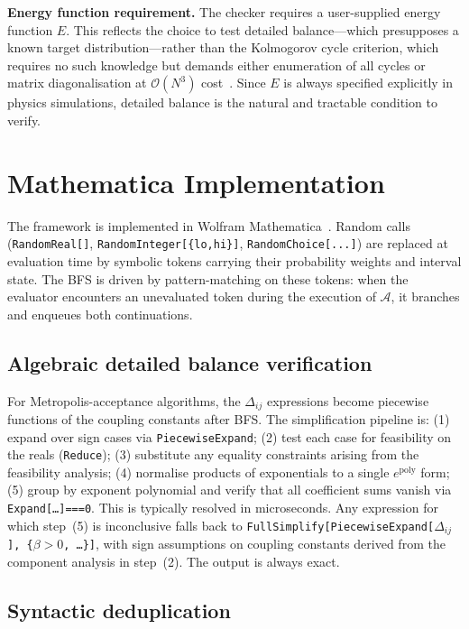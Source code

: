 \documentclass[twocolumn,10pt]{article}
\begin{document}
\medskip\noindent\textbf{Energy function requirement.}
The checker requires a user-supplied energy function $E$.  This reflects the
choice to test detailed balance---which presupposes a known target
distribution---rather than the Kolmogorov cycle criterion, which requires no
such knowledge but demands either enumeration of all cycles or matrix
diagonalisation at $\mathcal{O}(N^3)$ cost~\cite{Kelly1979}.  Since $E$ is
always specified explicitly in physics simulations, detailed balance is the
natural and tractable condition to verify.

\section{Mathematica Implementation}
\label{sec:mma}

The framework is implemented in Wolfram Mathematica~\cite{Mathematica}.  Random
calls (\texttt{RandomReal[]}, \texttt{RandomInteger[\{lo,hi\}]},
\texttt{RandomChoice[...]}) are replaced at evaluation time by symbolic tokens
carrying their probability weights and interval state.  The BFS is driven by
pattern-matching on these tokens: when the evaluator encounters an unevaluated
token during the execution of $\mathcal{A}$, it branches and enqueues both
continuations.

\subsection{Algebraic detailed balance verification}

For Metropolis-acceptance algorithms, the $\Delta_{ij}$ expressions become
piecewise functions of the coupling constants after BFS.  The simplification
pipeline is: (1) expand over sign cases via \texttt{PiecewiseExpand}; (2) test
each case for feasibility on the reals (\texttt{Reduce}); (3) substitute any
equality constraints arising from the feasibility analysis; (4) normalise
products of exponentials to a single $e^{\text{poly}}$ form; (5) group by
exponent polynomial and verify that all coefficient sums vanish via
\texttt{Expand[\ldots]===0}.  This is typically resolved in microseconds.  Any
expression for which step~(5) is inconclusive falls back to
\texttt{FullSimplify[PiecewiseExpand[$\Delta_{ij}$],
\{$\beta>0$,~\ldots\}]}, with sign assumptions on coupling constants derived
from the component analysis in step~(2).  The output is always exact.

\subsection{Syntactic deduplication}
\end{document}
